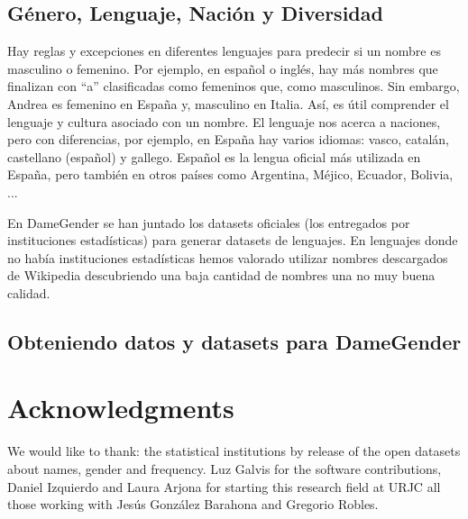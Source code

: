 \documentclass[a4paper]{article}
\begin{document}
\subsection{Género, Lenguaje, Nación y Diversidad}

Hay reglas y excepciones en diferentes lenguajes para predecir si
un nombre es masculino o femenino. Por ejemplo, en español o inglés,
hay más nombres que finalizan con ``a'' clasificadas como femeninos
que, como masculinos. Sin embargo, Andrea es femenino en España y,
masculino en Italia. Así, es útil comprender el lenguaje y cultura
asociado con un nombre. El lenguaje nos acerca a naciones, pero con
diferencias, por ejemplo, en España hay varios idiomas: vasco,
catalán, castellano (español) y gallego. Español es la lengua oficial
más utilizada en España, pero también en otros países como Argentina,
Méjico, Ecuador, Bolivia, ...

En DameGender se han juntado los datasets oficiales (los entregados
por instituciones estadísticas) para generar datasets de lenguajes.
En lenguajes donde no había instituciones estadísticas hemos valorado
utilizar nombres descargados de Wikipedia descubriendo una baja
cantidad de nombres una no muy buena calidad.

\subsection{Obteniendo datos y datasets para DameGender}




\section*{Acknowledgments}

We would like to thank: the statistical institutions by
release of the open datasets about names, gender and frequency.
Luz Galvis for the software contributions, Daniel Izquierdo and
Laura Arjona for starting this research field at URJC all those
working with Jesús González Barahona and Gregorio Robles. 



\end{document}
